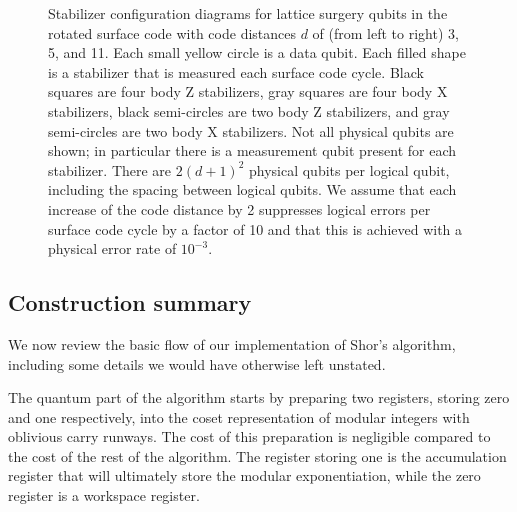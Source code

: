 \documentclass[superscriptaddress,notitlepage,longbibliography]{revtex4-1}
\theoremstyle{definition}
\theoremstyle{definition}
\begin{document}
\begin{figure}[ht]
    \caption{
        Stabilizer configuration diagrams for lattice surgery qubits in the rotated surface code with code distances $d$ of (from left to right) 3, 5, and 11.
        Each small yellow circle is a data qubit.
        Each filled shape is a stabilizer that is measured each surface code cycle.
        Black squares are four body Z stabilizers, gray squares are four body X stabilizers, black semi-circles are two body Z stabilizers, and gray semi-circles are two body X stabilizers.
        Not all physical qubits are shown; in particular there is a measurement qubit present for each stabilizer.
        There are $2 (d+1)^2$ physical qubits per logical qubit, including the spacing between logical qubits.
        We assume that each increase of the code distance by 2 suppresses logical errors per surface code cycle by a factor of 10 and that this is achieved with a physical error rate of $10^{-3}$.
    }
\end{figure}


\subsection{Construction summary}

We now review the basic flow of our implementation of Shor's algorithm, including some details we would have otherwise left unstated.

The quantum part of the algorithm starts by preparing two registers, storing zero and one respectively, into the coset representation of modular integers with oblivious carry runways.
The cost of this preparation is negligible compared to the cost of the rest of the algorithm.
The register storing one is the accumulation register that will ultimately store the modular exponentiation, while the zero register is a workspace register.
\end{document}
